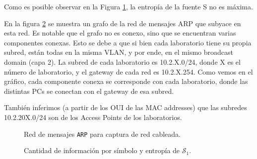 
Como es posible observar en la Figura \ref{res:esc1:fig1}, la entropía de la fuente S no es máxima.


\begin{figure}[h]
    \label{res:esc1:fig1}
\end{figure}

En la figura \ref{res:esc1:fig2} se muestra un grafo de la red de mensajes ARP que subyace en esta red. Es notable que el grafo no es conexo, sino que se encuentran varias componentes conexas. Esto se debe a que si bien cada laboratorio tiene su propia subred, están todas en la misma VLAN, y por ende, en el mismo broadcast domain (capa 2). La subred de cada laboratorio es 10.2.X.0/24, donde X es el número de laboratorio, y el gateway de cada red es 10.2.X.254. Como vemos en el gráfico, cada componente conexa se corresponde con cada laboratorio, donde las distintas PCs se conectan con el gateway de esa subred.

También inferimos (a partir de los OUI de las MAC addresses) que las subredes 10.2.20X.0/24 son de los Access Points de los laboratorios.



\begin{figure}[H]
    \caption{Red de mensajes \texttt{ARP} para captura de red cableada.}
    \label{res:esc1:fig2}
\end{figure}


\begin{figure}[h]
	\caption{Cantidad de información por símbolo y entropía de $\mathcal{S}_1$.}
    \label{res:esc1:fig3}
\end{figure}





